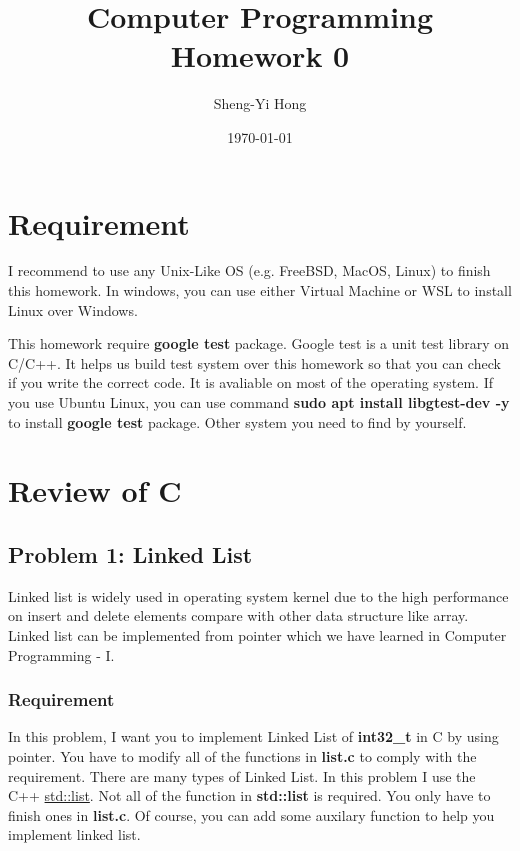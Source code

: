 \documentclass{report}
\title{Computer Programming Homework 0}
\author{Sheng-Yi Hong}
\date{\today}
\begin{document}
\maketitle

\tableofcontents

\chapter{Requirement}

I recommend to use any Unix-Like OS (e.g. FreeBSD, MacOS, Linux) to finish this
homework. In windows, you can use either Virtual Machine or WSL to install Linux over Windows.

This homework require \textbf{google test} package. Google test is a unit test
library on C/C++. It helps us build test system over this homework so that you can check
if you write the correct code. It is avaliable on most of the operating system. If you use Ubuntu Linux, you can use command \textbf{sudo apt install libgtest-dev
  -y} to install \textbf{google test} package. Other system you need to find by yourself.

\chapter{Review of C}

\section{Problem 1: Linked List}

Linked list is widely used in operating system kernel due to the high
performance on insert and delete elements compare with other data structure like
array. Linked list can be implemented from pointer which we have learned in
Computer Programming - I.

\subsection{Requirement}

In this problem, I want you to implement Linked List of \textbf{int32\_t} in C by
using pointer. You have to modify all of the functions in \textbf{list.c} to
comply with the requirement. There are many types of Linked List. In this
problem I use the C++
\href{https://en.cppreference.com/w/cpp/container/list}{std::list}. Not all of
the function in \textbf{std::list} is required. You only have to finish ones in
\textbf{list.c}. Of course, you can add some auxilary function to help you
implement linked list.
\end{document}
